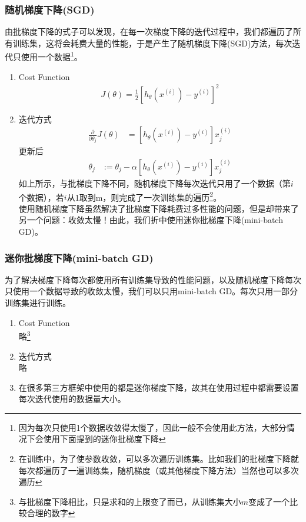 \subsubsection{随机梯度下降(SGD)}
由批梯度下降的式子可以发现，在每一次梯度下降的迭代过程中，我们都遍历了所有训练集，这将会耗费大量的性能，于是产生了随机梯度下降(SGD)方法，每次迭代只使用一个数据\footnote{因为每次只使用1个数据收敛得太慢了，因此一般不会使用此方法，大部分情况下会使用下面提到的迷你批梯度下降}。 \\
\begin{enumerate}
	\item Cost Function
	\begin{equation}\begin{aligned}
		J(\theta) = \frac{1}{2} \left[h_{\theta} {(x^{(i)})} - y^{(i)}\right]^2
	\end{aligned}\end{equation}

	\item 迭代方式
	\begin{equation}\begin{aligned}
	      \frac{\partial} {\partial \theta_j} J(\theta) &= \left[ h_\theta(x^{(i)}) - y^{(i)} \right]x_j^{(i)}
	\end{aligned}\end{equation}
	更新后
	\begin{equation}\begin{aligned}
		\theta_j &:= \theta_j - \alpha\left[ h_\theta(x^{(i)}) - y^{(i)} \right]x_j^{(i)}
	\end{aligned}\end{equation}
	如上所示，与批梯度下降不同，随机梯度下降每次迭代只用了一个数据（第$i$个数据），若$i$从1取到m，则完成了一次训练集的遍历\footnote{在训练中，为了使参数收敛，可以多次遍历训练集。比如我们的批梯度下降就每次都遍历了一遍训练集，随机梯度（或其他梯度下降方法）当然也可以多次遍历}。\\
	使用随机梯度下降虽然解决了批梯度下降耗费过多性能的问题，但是却带来了另一个问题：收敛太慢！由此，我们折中使用迷你批梯度下降(mini-batch GD)。\\
\end{enumerate}

\subsubsection{迷你批梯度下降(mini-batch GD)}
为了解决梯度下降每次都使用所有训练集导致的性能问题，以及随机梯度下降每次只使用一个数据导致的收敛太慢，我们可以只用mini-batch GD。每次只用一部分训练集进行训练。
\begin{enumerate}
	\item Cost Function \\
	略\footnote{与批梯度下降相比，只是求和的上限变了而已，从训练集大小$m$变成了一个比较合理的数字}

	\item 迭代方式 \\
	略
	\item 在很多第三方框架中使用的都是迷你梯度下降，故其在使用过程中都需要设置每次迭代使用的数据量大小。
\end{enumerate}


